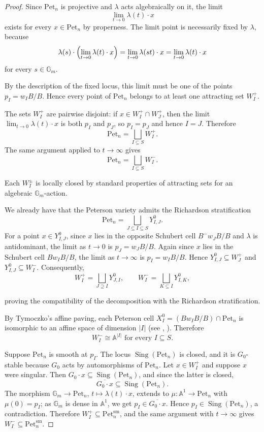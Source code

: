 \documentclass[12pt, reqno]{amsart}
\theoremstyle{plain}
\numberwithin{equation}{section}
\theoremstyle{definition}
\begin{document}
\begin{proof}
Since $\mathrm{Pet}_n$ is projective and $\lambda$ acts algebraically on it, the limit
\[
\lim_{t \to 0} \lambda(t)\cdot x
\]
exists for every $x \in \mathrm{Pet}_n$ by properness. The limit point is necessarily
fixed by $\lambda$, because
\[
\lambda(s)\cdot \Bigl(\lim_{t \to 0} \lambda(t)\cdot x\Bigr)
=
\lim_{t \to 0} \lambda(st)\cdot x
=
\lim_{t \to 0} \lambda(t)\cdot x
\]
for every $s \in \mathbb G_m$.

By the description of the fixed locus, this limit must be one of the points
$p_I = w_{I}B/B$. Hence every point of $\mathrm{Pet}_n$ belongs to at least one
attracting set $W_I^+$.

The sets $W_I^+$ are pairwise disjoint: if
$x \in W_I^+ \cap W_J^+$, then the limit $\lim_{t \to 0}\lambda(t)\cdot x$
is both $p_I$ and $p_J$, so $p_I = p_J$ and hence $I = J$. Therefore
\[
\mathrm{Pet}_n = \bigsqcup_{I \subseteq S} W_I^+.
\]
The same argument applied to $t \to \infty$ gives
\[
\mathrm{Pet}_n = \bigsqcup_{I \subseteq S} W_I^-.
\]

Each $W_I^\pm$ is locally closed by standard properties of attracting sets for
an algebraic $\mathbb G_m$-action. 

We already have that the  Peterson variety admits the Richardson stratification
\[
\mathrm{Pet}_n = \bigsqcup_{J \subseteq I \subseteq S} Y^0_{I,J}.
\]
For a point $x \in Y^0_{I,J}$, since $x$ lies in the opposite Schubert cell $B^-w_{J}B/B$ and $\lambda$ is antidominant, the limit as $t\to 0$ is $p_J = w_{J}B/B$. Again since $x$ lies in the Schubert cell $Bw_{I}B/B$, the limit as $t\to\infty$ is $p_I = w_{I}B/B$. Hence $Y^0_{I,J} \subseteq W_J^+$ and $Y^0_{I,J} \subseteq W_I^-$. Consequently,
\[
W_I^+ = \bigsqcup_{J \supseteq I} Y^0_{J,I}, \qquad
W_I^- = \bigsqcup_{K \subseteq I} Y^0_{I,K},
\]

proving the compatibility of the decomposition with the Richardson stratification.

By Tymoczko's affine paving, each Peterson cell $
X_I^0 = (B w_I B/B) \cap \mathrm{Pet}_n$
is isomorphic to an affine space of dimension $|I|$ (see \cite{Tymoczko}, \cite{Tymoczko1}). Therefore
\[
W_I^- \cong \mathbb{A}^{|I|}
\,\, \text{for every} \,\, I \subseteq S.\]

Suppose \(\mathrm{Pet}_n\) is smooth at \(p_I\). The locus
\(\operatorname{Sing}(\mathrm{Pet}_n)\) is closed, and it is \(G_0\)-stable because \(G_0\) acts by
automorphisms of \(\mathrm{Pet}_n\). Let \(x\in W_I^{+}\) and suppose \(x\) were singular. Then
\(G_0\cdot x\subseteq\operatorname{Sing}(\mathrm{Pet}_n)\), and since the latter is closed,
\[
\overline{G_0\cdot x}\subseteq\operatorname{Sing}(\mathrm{Pet}_n).
\]
The morphism \(\mathbb G_m\to\mathrm{Pet}_n\), \(t\mapsto\lambda(t)\cdot x\), extends to
\(\mu:\mathbb A^1\to\mathrm{Pet}_n\) with \(\mu(0)=p_I\); as \(\mathbb G_m\) is dense in
\(\mathbb A^1\), we get \(p_I\in\overline{G_0\cdot x}\). Hence
\(p_I\in\operatorname{Sing}(\mathrm{Pet}_n)\), a contradiction. Therefore
\(W_I^{+}\subseteq\mathrm{Pet}_n^{\mathrm{sm}}\), and the same argument with \(t\to\infty\) gives
\(W_I^{-}\subseteq\mathrm{Pet}_n^{\mathrm{sm}}\).


\end{proof}
\end{document}
